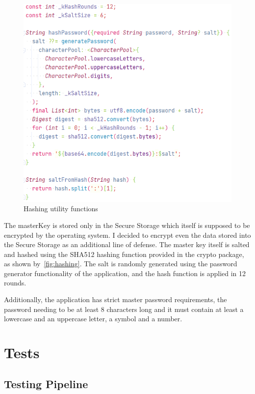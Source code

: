 \documentclass[a4paper,12pt]{report}
\begin{document}
\begin{figure}[H]
    \centering
    \includegraphics[scale=0.6]{images/code/hashing.png}
    \caption{Hashing utility functions}\label{fig:hashing}
\end{figure}

The masterKey is stored only in the Secure Storage which itself is supposed to
be encrypted by the operating system. I decided to encrypt even the data stored
into the Secure Storage as an additional line of defense. The master key itself
is salted and hashed using the SHA512 hashing function provided in the crypto
package\cite{cryptoDocs}, as shown by~\autoref{fig:hashing}. The salt is
randomly generated using the password generator functionality of the
application, and the hash function is applied in 12 rounds.

Additionally, the application has strict master password requirements, the
password needing to be at least 8 characters long and it must contain at least
a lowercase and an uppercase letter, a symbol and a number.

\chapter{Tests}

\section{Testing Pipeline}
\end{document}
